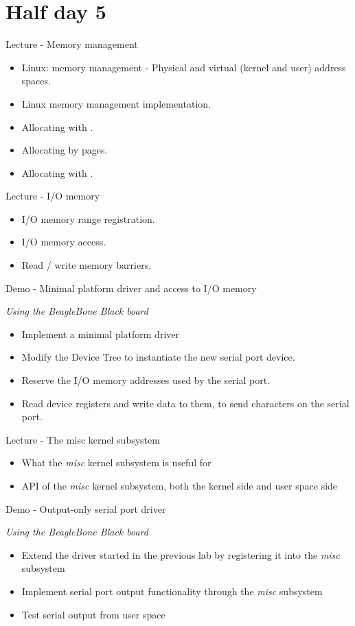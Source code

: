 \documentclass[a4paper,12pt,obeyspaces,spaces,hyphens]{article}
\begin{document}
\section{Half day 5}
\feagendaonecolumn
{Lecture - Memory management}
{
  \begin{itemize}
  \item Linux: memory management - Physical and virtual (kernel and user) address spaces.
  \item Linux memory management implementation.
  \item Allocating with .
  \item Allocating by pages.
  \item Allocating with .
  \end{itemize}
}

\feagendatwocolumn
{Lecture - I/O memory}
{
  \begin{itemize}
  \item I/O memory range registration.
  \item I/O memory access.
  \item Read / write memory barriers.
  \end{itemize}
}
{Demo - Minimal platform driver and access to I/O memory}
{
  {\em Using the BeagleBone Black board}
  \begin{itemize}
  \item Implement a minimal platform driver
  \item Modify the Device Tree to instantiate the new serial port
    device.
  \item Reserve the I/O memory addresses used by the serial port.
  \item Read device registers and write data to them, to send
    characters on the serial port.
  \end{itemize}
}

\feagendatwocolumn
{Lecture - The misc kernel subsystem}
{
  \begin{itemize}
  \item What the {\em misc} kernel subsystem is useful for
  \item API of the {\em misc} kernel subsystem, both the kernel side
    and user space side
  \end{itemize}
}
{Demo - Output-only serial port driver}
{
  {\em Using the BeagleBone Black board}
  \begin{itemize}
  \item Extend the driver started in the previous lab by registering
    it into the {\em misc} subsystem
  \item Implement serial port output functionality through the {\em
      misc} subsystem
  \item Test serial output from user space
  \end{itemize}
}
\end{document}
